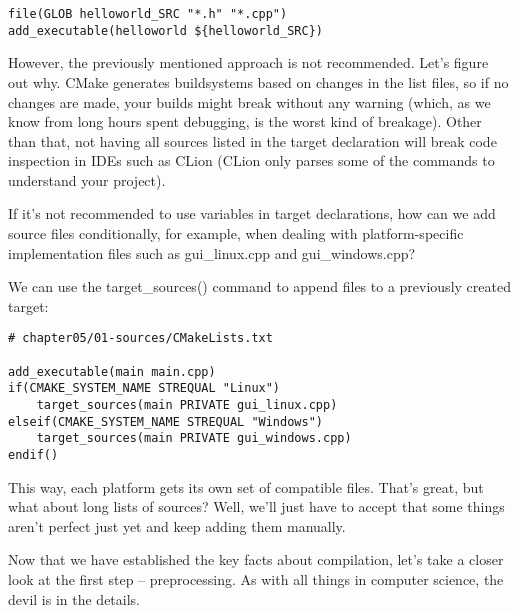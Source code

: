 \begin{lstlisting}[style=styleCMake]
file(GLOB helloworld_SRC "*.h" "*.cpp")
add_executable(helloworld ${helloworld_SRC})
\end{lstlisting}

However, the previously mentioned approach is not recommended. Let's figure out why.
CMake generates buildsystems based on changes in the list files, so if no changes are made, your builds might break without any warning (which, as we know from long hours spent debugging, is the worst kind of breakage). Other than that, not having all sources listed in the target declaration will break code inspection in IDEs such as CLion (CLion only parses some of the commands to understand your project).

If it's not recommended to use variables in target declarations, how can we add source files conditionally, for example, when dealing with platform-specific implementation files such as gui\_linux.cpp and gui\_windows.cpp?

We can use the target\_sources() command to append files to a previously created target:

\begin{lstlisting}[style=styleCMake]
# chapter05/01-sources/CMakeLists.txt

add_executable(main main.cpp)
if(CMAKE_SYSTEM_NAME STREQUAL "Linux")
	target_sources(main PRIVATE gui_linux.cpp)
elseif(CMAKE_SYSTEM_NAME STREQUAL "Windows")
	target_sources(main PRIVATE gui_windows.cpp)
endif()
\end{lstlisting}

This way, each platform gets its own set of compatible files. That's great, but what about long lists of sources? Well, we'll just have to accept that some things aren't perfect just yet and keep adding them manually.

Now that we have established the key facts about compilation, let's take a closer look at the first step – preprocessing. As with all things in computer science, the devil is in the details.























